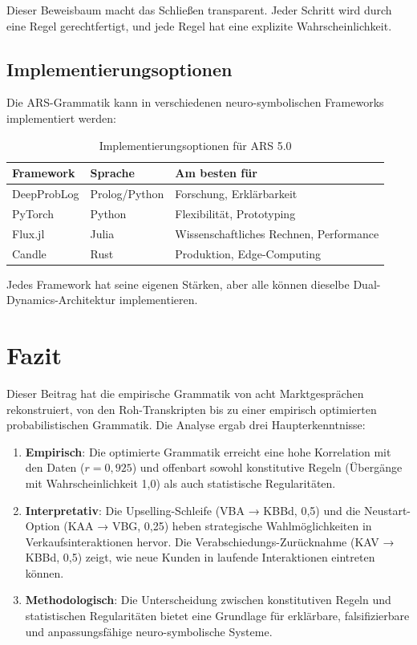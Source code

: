 \documentclass[12pt,a4paper]{article}
\begin{document}
Dieser Beweisbaum macht das Schließen transparent. Jeder Schritt wird durch
eine Regel gerechtfertigt, und jede Regel hat eine explizite Wahrscheinlichkeit.

\subsection{Implementierungsoptionen}

Die ARS-Grammatik kann in verschiedenen neuro-symbolischen Frameworks
implementiert werden:

\begin{table}[H]
\centering
\caption{Implementierungsoptionen für ARS 5.0}
\label{tab:options}
\begin{tabular}{@{} l l l @{}}
\toprule
\textbf{Framework} & \textbf{Sprache} & \textbf{Am besten für} \\
\midrule
DeepProbLog & Prolog/Python & Forschung, Erklärbarkeit \\
PyTorch & Python & Flexibilität, Prototyping \\
Flux.jl & Julia & Wissenschaftliches Rechnen, Performance \\
Candle & Rust & Produktion, Edge-Computing \\
\bottomrule
\end{tabular}
\end{table}

Jedes Framework hat seine eigenen Stärken, aber alle können dieselbe
Dual-Dynamics-Architektur implementieren.

\section{Fazit}

Dieser Beitrag hat die empirische Grammatik von acht Marktgesprächen
rekonstruiert, von den Roh-Transkripten bis zu einer empirisch optimierten
probabilistischen Grammatik. Die Analyse ergab drei Haupterkenntnisse:

\begin{enumerate}
    \item \textbf{Empirisch}: Die optimierte Grammatik erreicht eine hohe
    Korrelation mit den Daten (\(r = 0,925\)) und offenbart sowohl konstitutive
    Regeln (Übergänge mit Wahrscheinlichkeit 1,0) als auch statistische
    Regularitäten.
    
    \item \textbf{Interpretativ}: Die Upselling-Schleife (VBA → KBBd, 0,5) und
    die Neustart-Option (KAA → VBG, 0,25) heben strategische Wahlmöglichkeiten
    in Verkaufsinteraktionen hervor. Die Verabschiedungs-Zurücknahme (KAV → KBBd, 0,5)
    zeigt, wie neue Kunden in laufende Interaktionen eintreten können.
    
    \item \textbf{Methodologisch}: Die Unterscheidung zwischen konstitutiven
    Regeln und statistischen Regularitäten bietet eine Grundlage für erklärbare,
    falsifizierbare und anpassungsfähige neuro-symbolische Systeme.
\end{enumerate}
\end{document}
